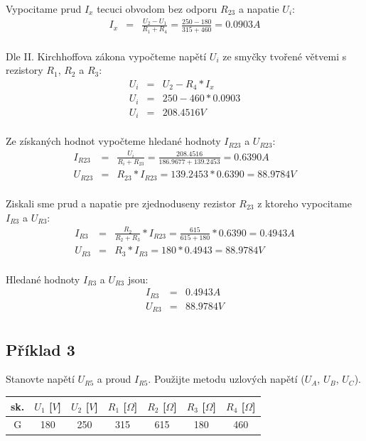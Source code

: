 \documentclass[a4paper,oneside,12pt]{article}
\begin{document}
	Vypocitame prud $I_{x}$ tecuci obvodom bez odporu $R_{23}$ a napatie $U_{i}$:
	\begin{eqnarray*}
		I_{x} &= & \frac{U_{2} - U_{1}}{R_{1} + R_{4}} = \frac{250 - 180}{315 + 460} = 0.0903 A\\
	\end{eqnarray*}

	Dle II. Kirchhoffova zákona vypočteme napětí $U_{i}$ ze smyčky tvořené větvemi s rezistory $R_{1}$, $R_{2}$ a $R_{3}$:
	\begin{eqnarray*}
		U_{i} &= & U_{2} - R_{4} * I_{x} \\
		U_{i} &= & 250 - 460 * 0.0903 \\
		U_{i} &= & 208.4516V \\
	\end{eqnarray*}

	Ze získaných hodnot vypočteme hledané hodnoty $I_{R23}$ a $U_{R23}$:
	\begin{eqnarray*}
		I_{R23} &= & \frac{U_{i}}{R_{i} + R_{23}} = \frac{208.4516}{186.9677 + 139.2453} = 0.6390 A\\
		U_{R23} &= & R_{23} * I_{R23} = 139.2453 * 0.6390 = 88.9784 V\\
	\end{eqnarray*}

	Ziskali sme prud a napatie pre zjednoduseny rezistor $R_{23}$ z ktoreho vypocitame $I_{R3}$ a $U_{R3}$:
	\begin{eqnarray*}
		I_{R3} &= & \frac{R_{2}}{R_{2} + R_{3}} * I_{R23} = \frac{615}{615 + 180} * 0.6390 = 0.4943 A\\
		U_{R3} &= & R_{3} * I_{R3} = 180 * 0.4943 = 88.9784 V\\
	\end{eqnarray*}

	Hledané hodnoty $I_{R3}$ a $U_{R3}$ jsou:
	\begin{eqnarray*}
		I_{R3} &= & 0.4943 A\\
		U_{R3} &= & 88.9784 V\\
	\end{eqnarray*}

	\newpage

	\subsection{Příklad 3}

	Stanovte napětí $U_{R5}$ a proud $I_{R5}$. Použijte metodu uzlových napětí ($U_{A}$, $U_{B}$, $U_{C}$).
	
	\begin{table}[h]
		\begin{center}
			\begin{tabular}{|c|c|c|c|c|c|c|}
				\hline
				sk. & $U_{1}$ [$V$] & $U_{2}$ [$V$] & $R_{1}$ [$\Omega$] & $R_{2}$ [$\Omega$] & $R_{3}$ [$\Omega$] & $R_{4}$ [$\Omega$]\\
				\hline
				G & 180 & 250 & 315 & 615 & 180 & 460 \\
				\hline
			\end{tabular}
		\end{center}
	\end{table}
\end{document}
